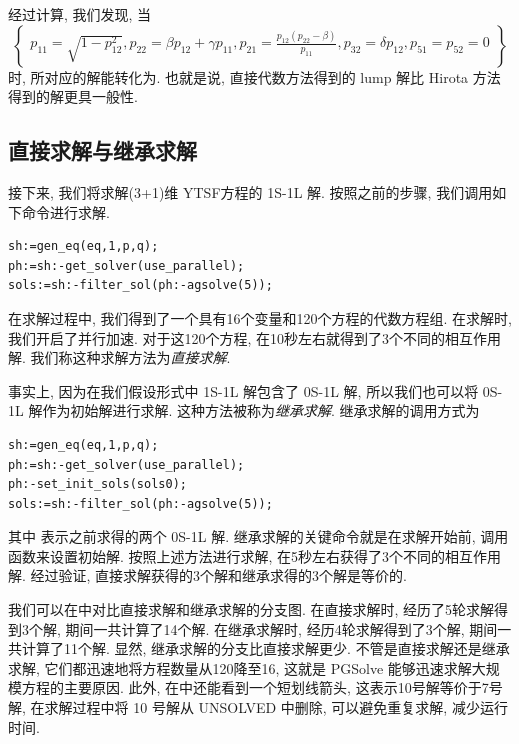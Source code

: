 经过计算, 我们发现, 当
\begin{equation}
\left\{ 
\begin{array}{l}
p_{11}=\sqrt{1-p_{12}^2},
p_{22}=\beta p_{12}+\gamma p_{11},
p_{21}=\frac{p_{12}(p_{22}-\beta)}{p_{11}},  
p_{32}=\delta p_{12},p_{51}=p_{52}=0
\end{array}
\right\}
\end{equation}
时, 所对应的解能转化为. 也就是说, 直接代数方法得到的 lump 解比 Hirota 方法得到的解更具一般性. 

\subsection{直接求解与继承求解}

接下来, 我们将求解(3+1)维 YTSF方程的 1S-1L 解. 按照之前的步骤, 我们调用如下命令进行求解. 
\begin{verbatim}
sh:=gen_eq(eq,1,p,q);
ph:=sh:-get_solver(use_parallel);
sols:=sh:-filter_sol(ph:-agsolve(5));
\end{verbatim}

在求解过程中, 我们得到了一个具有16个变量和120个方程的代数方程组. 在求解时, 我们开启了并行加速. 对于这120个方程, 在10秒左右就得到了3个不同的相互作用解. 我们称这种求解方法为\emph{直接求解}.

事实上, 因为在我们假设形式中 1S-1L 解包含了 0S-1L 解, 所以我们也可以将 0S-1L 解作为初始解进行求解. 这种方法被称为\emph{继承求解}. 继承求解的调用方式为
\begin{verbatim}
sh:=gen_eq(eq,1,p,q);
ph:=sh:-get_solver(use_parallel);
ph:-set_init_sols(sols0);
sols:=sh:-filter_sol(ph:-agsolve(5));
\end{verbatim}
其中 表示之前求得的两个 0S-1L 解. 继承求解的关键命令就是在求解开始前, 调用函数来设置初始解. 按照上述方法进行求解, 在5秒左右获得了3个不同的相互作用解. 经过验证, 直接求解获得的3个解和继承求得的3个解是等价的.

我们可以在中对比直接求解和继承求解的分支图. 在直接求解时, 经历了5轮求解得到3个解, 期间一共计算了14个解. 在继承求解时, 经历4轮求解得到了3个解, 期间一共计算了11个解. 显然, 继承求解的分支比直接求解更少. 不管是直接求解还是继承求解, 它们都迅速地将方程数量从120降至16, 这就是 PGSolve 能够迅速求解大规模方程的主要原因. 此外, 在中还能看到一个短划线箭头, 这表示10号解等价于7号解, 在求解过程中将 10 号解从 UNSOLVED 中删除, 可以避免重复求解, 减少运行时间. 

